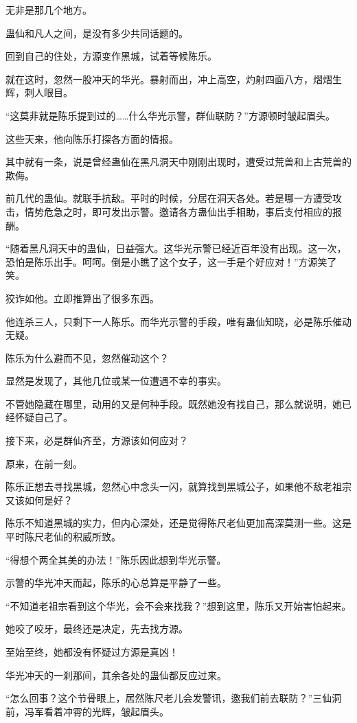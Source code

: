 \begin{this_body}
无非是那几个地方。

蛊仙和凡人之间，是没有多少共同话题的。

回到自己的住处，方源变作黑城，试着等候陈乐。

就在这时，忽然一股冲天的华光。暴射而出，冲上高空，灼射四面八方，熠熠生辉，刺人眼目。

“这莫非就是陈乐提到过的……什么华光示警，群仙联防？”方源顿时皱起眉头。

这些天来，他向陈乐打探各方面的情报。

其中就有一条，说是曾经蛊仙在黑凡洞天中刚刚出现时，遭受过荒兽和上古荒兽的欺侮。

前几代的蛊仙。就联手抗敌。平时的时候，分居在洞天各处。若是哪一方遭受攻击，情势危急之时，即可发出示警。邀请各方蛊仙出手相助，事后支付相应的报酬。

“随着黑凡洞天中的蛊仙，日益强大。这华光示警已经近百年没有出现。这一次，恐怕是陈乐出手。呵呵。倒是小瞧了这个女子，这一手是个好应对！”方源笑了笑。

狡诈如他。立即推算出了很多东西。

他连杀三人，只剩下一人陈乐。而华光示警的手段，唯有蛊仙知晓，必是陈乐催动无疑。

陈乐为什么避而不见，忽然催动这个？

显然是发现了，其他几位或某一位遭遇不幸的事实。

不管她隐藏在哪里，动用的又是何种手段。既然她没有找自己，那么就说明，她已经怀疑自己了。

接下来，必是群仙齐至，方源该如何应对？

原来，在前一刻。

陈乐正想去寻找黑城，忽然心中念头一闪，就算找到黑城公子，如果他不敌老祖宗又该如何是好？

陈乐不知道黑城的实力，但内心深处，还是觉得陈尺老仙更加高深莫测一些。这是平时陈尺老仙的积威所致。

“得想个两全其美的办法！”陈乐因此想到华光示警。

示警的华光冲天而起，陈乐的心总算是平静了一些。

“不知道老祖宗看到这个华光，会不会来找我？”想到这里，陈乐又开始害怕起来。

她咬了咬牙，最终还是决定，先去找方源。

至始至终，她都没有怀疑过方源是真凶！

华光冲天的一刹那间，其余各处的蛊仙都反应过来。

“怎么回事？这个节骨眼上，居然陈尺老儿会发警讯，邀我们前去联防？”三仙洞前，冯军看着冲霄的光辉，皱起眉头。


\end{this_body}
